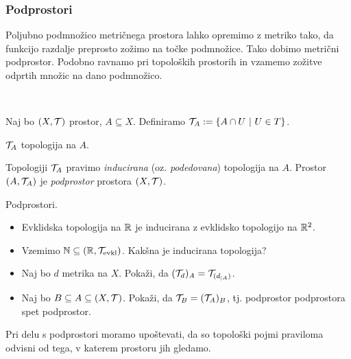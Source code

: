 \subsubsection{Podprostori}
Poljubno podmnožico metričnega prostora lahko opremimo z metriko tako, da funkcijo razdalje preprosto zožimo na točke podmnožice. Tako dobimo metrični podprostor. Podobno ravnamo pri topoloških prostorih in vzamemo zožitve odprtih množic na dano podmnožico.

\,

Naj bo $(X, \mathcal{T})$ prostor, $A \subseteq X$. Definiramo $\mathcal{T}_A := \left\{A \cap U \ | \ U \in T\right\}$.

\begin{trditev}
    $\mathcal{T}_A$ topologija na $A$.
\end{trditev}

\begin{definicija}
    Topologiji $\mathcal{T}_A$ pravimo \emph{inducirana} (oz. \emph{podedovana}) topologija na $A$.
    Prostor $(A, \mathcal{T}_A)$ je \emph{podprostor} prostora $(X, \mathcal{T})$.
\end{definicija}

\begin{primer}
    Podprostori.
    \begin{itemize}
        \item Evklidska topologija na $\mathbb{R}$ je inducirana z evklidsko topologijo na $\mathbb{R}^2$.
        \item Vzemimo $\mathbb{N} \subseteq (\mathbb{R}, \mathcal{T}_\text{evkl})$. Kakšna je inducirana topologija?
        \item Naj bo $d$ metrika na $X$. Pokaži, da $(\mathcal{T}_d)_A = \mathcal{T}_{(d_{|A})}$.        
        \item Naj bo $B \subseteq A \subseteq (X, \mathcal{T})$. Pokaži, da $\mathcal{T}_B = (\mathcal{T}_A)_B$, tj. podprostor podprostora spet podprostor.
    \end{itemize}
\end{primer}

\begin{opomba}
    Pri delu s podprostori moramo upoštevati, da so topološki pojmi praviloma odvisni od tega, v katerem prostoru jih gledamo.
\end{opomba}

